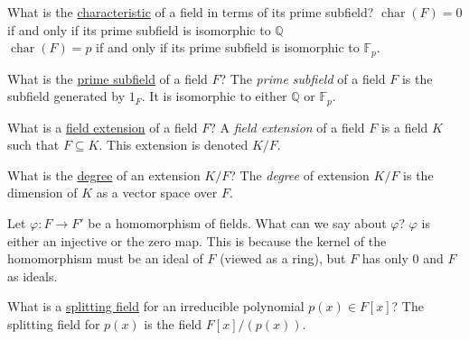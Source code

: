 \documentclass[avery5371,grid]{flashcards}
\newcommand{\Q}{\mathbb{Q}}
\newcommand{\F}{\mathbb{F}}
\DeclareMathOperator{\ch}{char}
\let \phi \varphi
\begin{document}
\begin{flashcard}[Fields]{What is the \underline{characteristic} of a field in terms of its prime subfield?}
 $\ch(F) = 0$ if and only if its prime subfield is isomorphic to $\Q$\\
 
 $\ch(F) = p$ if and only if its prime subfield is isomorphic to $\F_p$.
\end{flashcard}

\begin{flashcard}[Fields]{What is the \underline{prime subfield} of a field $F$?}
 The \emph{prime subfield} of a field $F$ is the subfield generated by $1_F$. It is isomorphic to either $\Q$ or $\F_p$.
\end{flashcard}

\begin{flashcard}[Fields]{What is a \underline{field extension} of a field $F$?}
 A \emph{field extension} of a field $F$ is a field $K$ such that $F \subseteq K$. This extension is denoted $K/F$.
\end{flashcard}

\begin{flashcard}[Fields]{What is the \underline{degree} of an extension $K/F$?}
 The \emph{degree} of extension $K/F$ is the dimension of $K$ as a vector space over $F$.
\end{flashcard}

\begin{flashcard}[Fields]{Let $\phi: F \to F'$ be a homomorphism of fields. What can we say about $\phi$?}
 $\phi$ is either an injective or the zero map. This is because the kernel of the homomorphism must be an ideal of $F$ (viewed as a ring), but $F$ has only 0 and $F$ as ideals.
\end{flashcard}

\begin{flashcard}[Fields]{What is a \underline{splitting field} for an irreducible polynomial $p(x) \in F[x]$?}
 The splitting field for $p(x)$ is the field $F[x]/(p(x))$.
\end{flashcard}
\end{document}
